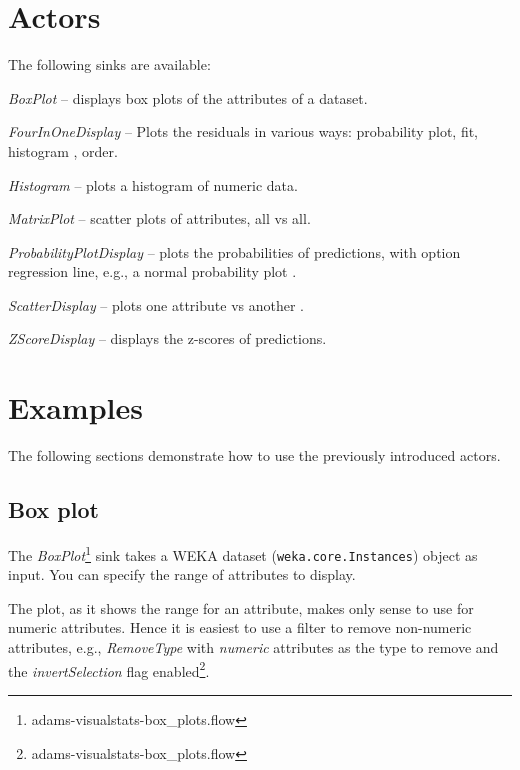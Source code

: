 \documentclass[a4paper]{book}
\begin{document}
\section{Actors}
The following sinks are available:
\begin{tight_itemize}
	\item \textit{BoxPlot} -- displays box plots \cite{boxplot} of the attributes
	of a dataset.
	\item \textit{FourInOneDisplay} -- Plots the residuals\cite{4in1} in various ways: 
	probability plot, fit, histogram \cite{histogram}, order.
	\item \textit{Histogram} -- plots a histogram\cite{histogram} of numeric data.
	\item \textit{MatrixPlot} -- scatter plots of attributes, all vs all.
	\item \textit{ProbabilityPlotDisplay} -- plots the probabilities of 
	predictions, with option regression line, e.g., a normal probability
	plot \cite{normalprobplot}.
	\item \textit{ScatterDisplay} -- plots one attribute vs another 
	\cite{scatterplot}.
	\item \textit{ZScoreDisplay} -- displays the z-scores of predictions.
\end{tight_itemize}

\newpage
\section{Examples}
The following sections demonstrate how to use the previously introduced actors.

\subsection{Box plot}
The \textit{BoxPlot}\footnote{adams-visualstats-box\_plots.flow} sink takes
a WEKA dataset (\texttt{weka.core.Instances}) object as input. You can specify
the range of attributes to display.

The plot, as it shows the range for an attribute, makes only sense to use for
numeric attributes. Hence it is easiest to use a filter to remove non-numeric
attributes, e.g., \textit{RemoveType} with \textit{numeric} attributes as the
type to remove and the \textit{invertSelection} flag 
enabled\footnote{adams-visualstats-box\_plots.flow}.
\end{document}
